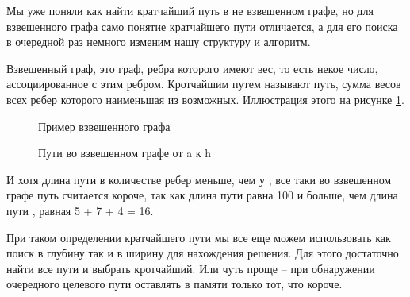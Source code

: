 \documentclass[../article.tex]{subfiles}
\begin{document}
{Мы уже поняли как найти кратчайший путь в не взвешенном графе, но для взвешенного графа само понятие кратчайшего пути отличается, а для его поиска в очередной раз немного изменим нашу структуру и алгоритм.}

Взвешенный граф, это граф, ребра которого имеют вес, то есть некое число, ассоциированное с этим ребром. Кротчайшим путем называют путь, сумма весов всех ребер которого наименьшая из возможных. Иллюстрация этого на рисунке \ref{fig:compareWeightedPaths}.

\begin{figure}
    \caption{Пример взвешенного графа}
\end{figure}

\begin{figure}
    \caption{Пути во взвешенном графе от {\firacodebold a} к {\firacodebold h}}
    \label{fig:compareWeightedPaths}
\end{figure}

И хотя длина пути {\firacodebold [a, h]} в количестве ребер меньше, чем у {\firacodebold [a, f, g, h]}, все таки во взвешенном графе путь {\firacodebold [a, f, g, h]} считается короче, так как длина пути {\firacodebold [a, h]} равна 100 и больше, чем длина пути {\firacodebold [a, f, g, h]}, равная 5 + 7 + 4 = 16.

При таком определении кратчайшего пути мы все еще можем использовать как поиск в глубину так и в ширину для нахождения решения. Для этого достаточно найти все пути и выбрать кротчайший. Или чуть проще – при обнаружении очередного целевого пути оставлять в памяти только тот, что короче.
\end{document}
